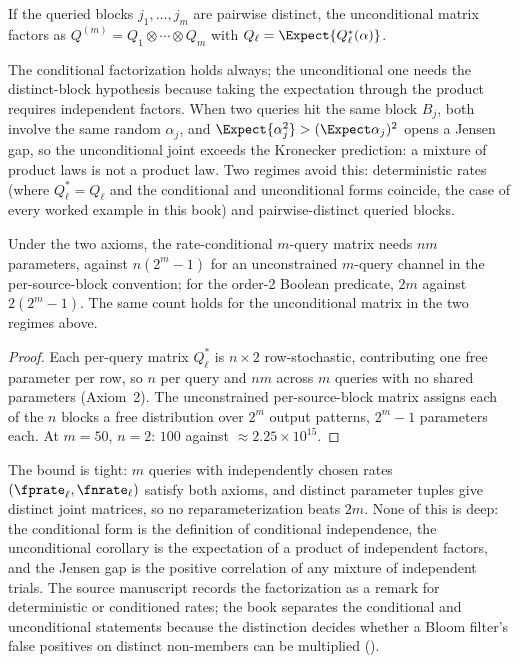 \begin{corollary}
\label{cor:kronecker-unconditional}
If the queried blocks $j_1, \ldots, j_m$ are pairwise distinct, the
unconditional matrix factors as $Q^{(m)} = Q_1 \otimes \cdots \otimes Q_m$ with
$Q_\ell = \Expect{Q^*_\ell(\alpha)}$.
\end{corollary}

The conditional factorization holds always; the unconditional one needs the
distinct-block hypothesis because taking the expectation through the product
requires independent factors. When two queries hit the same block $B_j$, both
involve the same random $\alpha_j$, and $\Expect{\alpha_j^2} > (\Expect
\alpha_j)^2$ opens a Jensen gap, so the unconditional joint exceeds the
Kronecker prediction: a mixture of product laws is not a product law. Two regimes avoid this: deterministic rates (where
$Q^*_\ell = Q_\ell$ and the conditional and unconditional forms coincide, the
case of every worked example in this book) and pairwise-distinct queried blocks.

\begin{corollary}
\label{cor:parameter-reduction}
Under the two axioms, the rate-conditional $m$-query matrix needs $nm$
parameters, against $n(2^m - 1)$ for an unconstrained $m$-query channel in the
per-source-block convention; for the order-2 Boolean predicate, $2m$ against
$2(2^m - 1)$. The same count holds for the unconditional matrix in the two
regimes above.
\end{corollary}

\begin{proof}
Each per-query matrix $Q^*_\ell$ is $n \times 2$ row-stochastic, contributing
one free parameter per row, so $n$ per query and $nm$ across $m$ queries with no
shared parameters (Axiom~2). The unconstrained per-source-block matrix assigns
each of the $n$ blocks a free distribution over $2^m$ output patterns, $2^m - 1$
parameters each. At $m = 50$, $n = 2$: $100$ against $\approx 2.25 \times
10^{15}$.
\end{proof}

The bound is tight: $m$ queries with independently chosen rates $(\fprate_\ell,
\fnrate_\ell)$ satisfy both axioms, and distinct parameter tuples give distinct
joint matrices, so no reparameterization beats $2m$. None of this is deep: the
conditional form is the definition of conditional independence, the
unconditional corollary is the expectation of a product of independent factors,
and the Jensen gap is the positive correlation of any mixture of independent
trials. The source manuscript \parencite{towell-bernoulli-sets} records the
factorization as a remark for deterministic or conditioned rates; the book
separates the conditional and unconditional statements because the
distinction decides whether a Bloom filter's false positives on distinct
non-members can be multiplied ().

